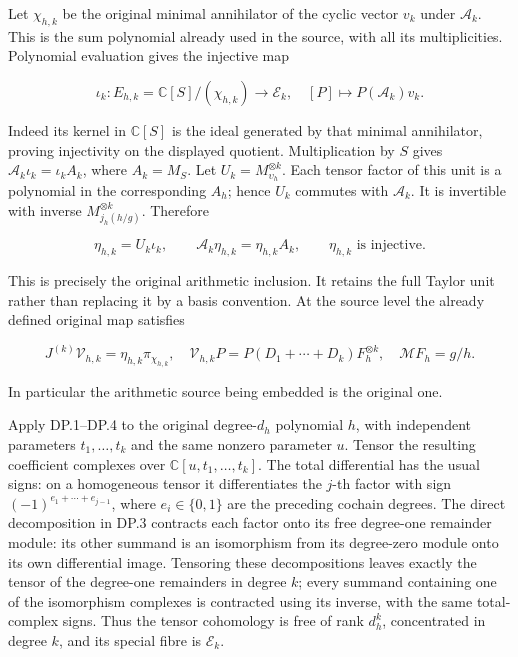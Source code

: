 Let \(\chi_{h,k}\) be the original minimal annihilator of the cyclic vector \(v_k\) under \(\mathcal A_k\). This is the sum polynomial already used in the source, with all its multiplicities. Polynomial evaluation gives the injective map

\[
\iota_k:E_{h,k}=\mathbb C[S]/(\chi_{h,k})\longrightarrow\mathcal E_k,
\quad [P]\longmapsto P(\mathcal A_k)v_k.
\tag{DP.25}
\]

Indeed its kernel in \(\mathbb C[S]\) is the ideal generated by that minimal annihilator, proving injectivity on the displayed quotient. Multiplication by \(S\) gives \(\mathcal A_k\iota_k=\iota_k A_k\), where \(A_k=M_S\). Let \(U_k=M_{\upsilon_h}^{\otimes k}\). Each tensor factor of this unit is a polynomial in the corresponding \(A_h\); hence \(U_k\) commutes with \(\mathcal A_k\). It is invertible with inverse \(M_{j_h(h/g)}^{\otimes k}\). Therefore

\[
\eta_{h,k}=U_k\iota_k,
\qquad \mathcal A_k\eta_{h,k}=\eta_{h,k}A_k,
\qquad \eta_{h,k}\text{ is injective}.
\tag{DP.26}
\]

This is precisely the original arithmetic inclusion. It retains the full Taylor unit rather than replacing it by a basis convention. At the source level the already defined original map satisfies

\[
J^{(k)}\mathcal V_{h,k}=\eta_{h,k}\pi_{\chi_{h,k}},
\quad \mathcal V_{h,k}P=P(D_1+\cdots+D_k)F_h^{\otimes k},
\quad \mathcal M F_h=g/h.
\tag{DP.27}
\]

In particular the arithmetic source being embedded is the original one.

Apply DP.1--DP.4 to the original degree-\(d_h\) polynomial \(h\), with independent parameters \(t_1,\ldots,t_k\) and the same nonzero parameter \(u\). Tensor the resulting coefficient complexes over \(\mathbb C[u,t_1,\ldots,t_k]\). The total differential has the usual signs: on a homogeneous tensor it differentiates the \(j\)-th factor with sign \((-1)^{e_1+\cdots+e_{j-1}}\), where \(e_i\in\{0,1\}\) are the preceding cochain degrees. The direct decomposition in DP.3 contracts each factor onto its free degree-one remainder module: its other summand is an isomorphism from its degree-zero module onto its own differential image. Tensoring these decompositions leaves exactly the tensor of the degree-one remainders in degree \(k\); every summand containing one of the isomorphism complexes is contracted using its inverse, with the same total-complex signs. Thus the tensor cohomology is free of rank \(d_h^k\), concentrated in degree \(k\), and its special fibre is \(\mathcal E_k\).

